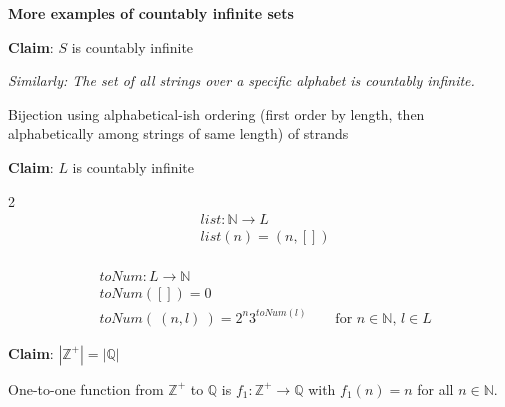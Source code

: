 
{\bf More examples of countably infinite sets}

{\bf Claim}: $S$ is countably infinite

{\it Similarly: The set of all strings over a specific alphabet is countably infinite.}
\begin{center}
Bijection using alphabetical-ish ordering
(first order by length, then alphabetically among strings of same length) 
of strands
\end{center}

\vspace{50pt}


{\bf Claim}: $L$ is countably infinite

\begin{multicols}{2}
\begin{align*}
    &list: \mathbb{N} \to L \\
    &list(n) = (n, []) \\
    &
\end{align*}

\begin{align*}
    &toNum: L \to \mathbb{N} \\
    &toNum([]) = 0 \\
    &toNum( ~(n,l)~) = 2^n 3^{toNum(l)} \qquad \text{for $n \in \mathbb{N}$, $l \in L$}
\end{align*}
\end{multicols}
\vspace{30pt}

{\bf Claim}: $|\mathbb{Z}^+| = |\mathbb{Q}|$ 

One-to-one function from $\mathbb{Z}^+$ to $\mathbb{Q}$
is $f_1: \mathbb{Z}^+ \to \mathbb{Q}$ with $f_1(n) = n$ for all 
$n \in \mathbb{N}$.

\vspace{30pt}


